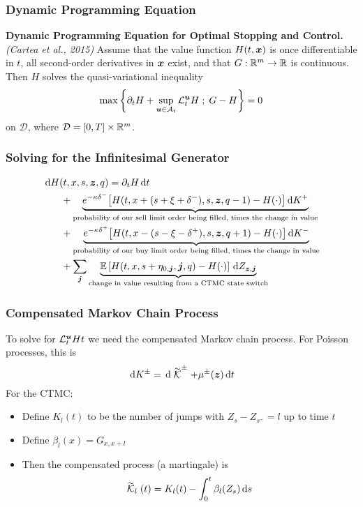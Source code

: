 \begin{frame}
\frametitle{Dynamic Programming Equation}
\begin{theorem}{\bf Dynamic Programming Equation for Optimal Stopping and Control.} \textit{(Cartea et al., 2015)} Assume that the value function $H(t,\bm{x})$ is once differentiable in $t$, all second-order derivatives in $\bm{x}$ exist, and that $G : \mathbb{R}^m \rightarrow \mathbb{R}$ is continuous. Then $H$ solves the quasi-variational inequality
\[
\max \left\lbrace \partial_t H + \sup \limits_{\bm{u} \in \mathcal{A}_t} \mathcal{L}^{\bm{u}}_t H \; ; \; G - H \right\rbrace = 0
\]
on $\mathcal{D}$, where $\mathcal{D} = [0,T] \times \mathbb{R}^m$.
\end{theorem}
\end{frame}

\begin{frame}
\frametitle{Solving for the Infinitesimal Generator}
\[
\begin{aligned}
& \,\mathrm{d} H (t,x,s,\bm{z},q) = \partial_t H \,\mathrm{d} t \\
& \hphantom{\partial_t H} + \underbrace{e^{ -\kappa \delta^{-}} \bigl[ H(t,x+(s+\xi+\delta^-),s,\bm{z},q-1) - H(\cdot) \bigr] \,\mathrm{d} K^+}_{\text{probability of our sell limit order being filled, times the change in value}} \\
& \hphantom{\partial_t H} + \underbrace{e^{ -\kappa \delta^{+}} \bigl[ H(t,x-(s-\xi-\delta^+),s,\bm{z},q+1) - H(\cdot) \bigr] \,\mathrm{d} K^-}_{\text{probability of our buy limit order being filled, times the change in value}} \\
& \hphantom{\partial_t H} + \sum_{\bm{j}} \underbrace{\mathbb{E} \left[ H(t,x,s+\eta_{0,\bm{j}},\bm{j},q) - H(\cdot) \right] \,\mathrm{d} Z_{\bm{z},\bm{j}}}_{\text{change in value resulting from a CTMC state switch}}
\end{aligned}
\]
\end{frame}

\begin{frame}
\frametitle{Compensated Markov Chain Process}
To solve for $\mathcal{L}^{\bm{u}}_t Ht$ we need the compensated Markov chain process.
\vspace{\baselineskip}
For Poisson processes, this is
\[ \d K^{\pm} = \d \simcal{K}^{\pm} + \mu^{\pm}(\bz) \d t \]
For the CTMC:
\begin{itemize}
\item Define $K_l(t)$ to be the number of jumps with $Z_s - Z_{s^-} = l$ up to time $t$ 
\item Define $\beta_l(x) = G_{x,x+l}$
\item Then the compensated process (a martingale) is \[ \simcal{K}_l(t) = K_l(t) - \int_0^t \beta_l(Z_s) \d s \]
\end{itemize}
\end{frame}

